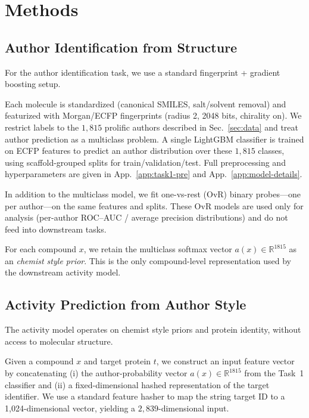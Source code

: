 \documentclass[11pt]{article}
\begin{document}
\section{Methods}\label{sec:models}

\subsection{Author Identification from Structure}

For the author identification task, we use a standard fingerprint + gradient boosting setup.

Each molecule is standardized (canonical SMILES, salt/solvent removal) and featurized with Morgan/ECFP fingerprints (radius 2, 2048 bits, chirality on). We restrict labels to the $1{,}815$ prolific authors described in Sec.~\ref{sec:data} and treat author prediction as a multiclass problem. A single LightGBM classifier is trained on ECFP features to predict an author distribution over these $1{,}815$ classes, using scaffold-grouped splits for train/validation/test. Full preprocessing and hyperparameters are given in App.~\ref{app:task1-pre} and App.~\ref{app:model-details}.

In addition to the multiclass model, we fit one-vs-rest (OvR) binary probes---one per author---on the same features and splits. These OvR models are used only for analysis (per-author ROC--AUC / average precision distributions) and do not feed into downstream tasks.

For each compound $x$, we retain the multiclass softmax vector
$a(x)\in\mathbb{R}^{1815}$ as an \emph{chemist style prior}. This is the only compound-level representation used by the downstream activity model.


\subsection{Activity Prediction from Author Style}

The activity model operates on chemist style priors and protein identity, without access to molecular structure.

Given a compound $x$ and target protein $t$, we construct an input feature vector by concatenating (i) the author-probability vector $a(x)\in\mathbb{R}^{1815}$ from the Task~1 classifier and (ii) a fixed-dimensional hashed representation of the target identifier. We use a standard feature hasher to map the string target ID to a 1,024-dimensional vector, yielding a $2{,}839$-dimensional input.
\end{document}
